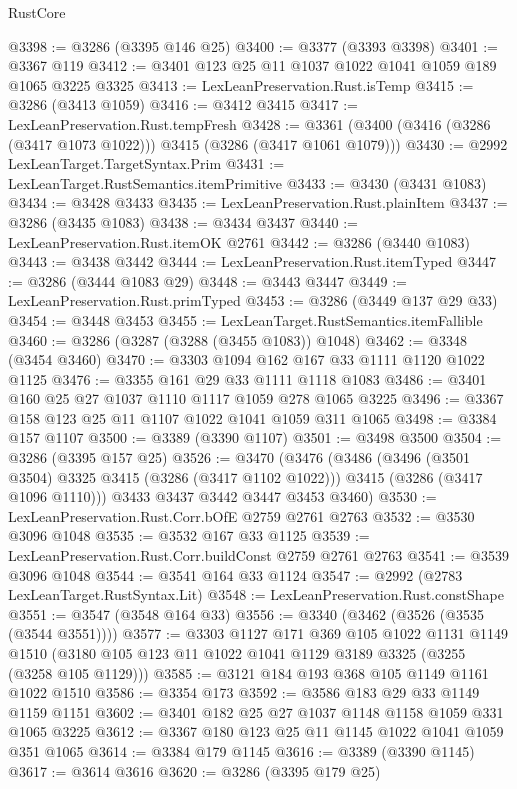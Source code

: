 \begin{lexlean}{RustCore}
\begin{coremodule}
@3398 := @3286 (@3395 @146 @25)
@3400 := @3377 (@3393 @3398)
@3401 := @3367 @119
@3412 := @3401 @123 @25 @11 @1037 @1022 @1041 @1059 @189 @1065 @3225 @3325
@3413 := LexLeanPreservation.Rust.isTemp
@3415 := @3286 (@3413 @1059)
@3416 := @3412 @3415
@3417 := LexLeanPreservation.Rust.tempFresh
@3428 := @3361 (@3400 (@3416 (@3286 (@3417 @1073 @1022))) @3415 (@3286 (@3417 @1061 @1079)))
@3430 := @2992 LexLeanTarget.TargetSyntax.Prim
@3431 := LexLeanTarget.RustSemantics.itemPrimitive
@3433 := @3430 (@3431 @1083)
@3434 := @3428 @3433
@3435 := LexLeanPreservation.Rust.plainItem
@3437 := @3286 (@3435 @1083)
@3438 := @3434 @3437
@3440 := LexLeanPreservation.Rust.itemOK @2761
@3442 := @3286 (@3440 @1083)
@3443 := @3438 @3442
@3444 := LexLeanPreservation.Rust.itemTyped
@3447 := @3286 (@3444 @1083 @29)
@3448 := @3443 @3447
@3449 := LexLeanPreservation.Rust.primTyped
@3453 := @3286 (@3449 @137 @29 @33)
@3454 := @3448 @3453
@3455 := LexLeanTarget.RustSemantics.itemFallible
@3460 := @3286 (@3287 (@3288 (@3455 @1083)) @1048)
@3462 := @3348 (@3454 @3460)
@3470 := @3303 @1094 @162 @167 @33 @1111 @1120 @1022 @1125
@3476 := @3355 @161 @29 @33 @1111 @1118 @1083
@3486 := @3401 @160 @25 @27 @1037 @1110 @1117 @1059 @278 @1065 @3225
@3496 := @3367 @158 @123 @25 @11 @1107 @1022 @1041 @1059 @311 @1065
@3498 := @3384 @157 @1107
@3500 := @3389 (@3390 @1107)
@3501 := @3498 @3500
@3504 := @3286 (@3395 @157 @25)
@3526 := @3470
    (@3476
      (@3486
        (@3496 (@3501 @3504) @3325 @3415 (@3286 (@3417 @1102 @1022)))
        @3415
        (@3286 (@3417 @1096 @1110)))
      @3433
      @3437
      @3442
      @3447
      @3453
      @3460)
@3530 := LexLeanPreservation.Rust.Corr.bOfE @2759 @2761 @2763
@3532 := @3530 @3096 @1048
@3535 := @3532 @167 @33 @1125
@3539 := LexLeanPreservation.Rust.Corr.buildConst @2759 @2761 @2763
@3541 := @3539 @3096 @1048
@3544 := @3541 @164 @33 @1124
@3547 := @2992 (@2783 LexLeanTarget.RustSyntax.Lit)
@3548 := LexLeanPreservation.Rust.constShape
@3551 := @3547 (@3548 @164 @33)
@3556 := @3340 (@3462 (@3526 (@3535 (@3544 @3551))))
@3577 := @3303
    @1127
    @171
    @369
    @105
    @1022
    @1131
    @1149
    @1510
    (@3180 @105 @123 @11 @1022 @1041 @1129 @3189 @3325 (@3255 (@3258 @105 @1129)))
@3585 := @3121 @184 @193 @368 @105 @1149 @1161 @1022 @1510
@3586 := @3354 @173
@3592 := @3586 @183 @29 @33 @1149 @1159 @1151
@3602 := @3401 @182 @25 @27 @1037 @1148 @1158 @1059 @331 @1065 @3225
@3612 := @3367 @180 @123 @25 @11 @1145 @1022 @1041 @1059 @351 @1065
@3614 := @3384 @179 @1145
@3616 := @3389 (@3390 @1145)
@3617 := @3614 @3616
@3620 := @3286 (@3395 @179 @25)

\end{coremodule}
\end{lexlean}
